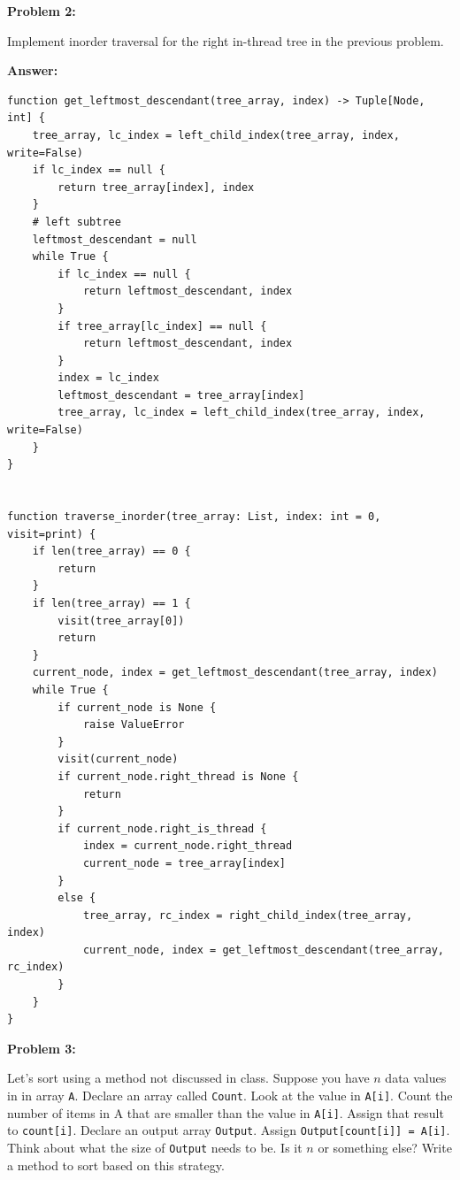 \documentclass[10pt,letterpaper,final]{report}
\begin{document}
\medskip
\noindent\textbf{Problem 2:}
\medskip

Implement inorder traversal for the right in-thread tree in the previous problem.

\medskip
\noindent\textbf{Answer:}
\medskip

\begin{verbatim}
function get_leftmost_descendant(tree_array, index) -> Tuple[Node, int] {
    tree_array, lc_index = left_child_index(tree_array, index, write=False)
    if lc_index == null {
        return tree_array[index], index
    }
    # left subtree
    leftmost_descendant = null
    while True {
        if lc_index == null {
            return leftmost_descendant, index
        }
        if tree_array[lc_index] == null {
            return leftmost_descendant, index
        }
        index = lc_index
        leftmost_descendant = tree_array[index]
        tree_array, lc_index = left_child_index(tree_array, index, write=False) 
    }
}


function traverse_inorder(tree_array: List, index: int = 0, visit=print) {
    if len(tree_array) == 0 {
        return
    }
    if len(tree_array) == 1 {
        visit(tree_array[0])
        return
    }
    current_node, index = get_leftmost_descendant(tree_array, index)
    while True {
        if current_node is None {
            raise ValueError
        }
        visit(current_node)
        if current_node.right_thread is None {
            return
        }
        if current_node.right_is_thread {
            index = current_node.right_thread
            current_node = tree_array[index]
        }
        else {
            tree_array, rc_index = right_child_index(tree_array, index)
            current_node, index = get_leftmost_descendant(tree_array, rc_index)
        }
    }
}
\end{verbatim}

\pagebreak
\noindent\textbf{Problem 3:}
\medskip

Let's sort using a method not discussed in class. Suppose you have $n$ data values in in array \texttt{A}.  Declare an array called \texttt{Count}.  Look at the value in \texttt{A[i]}. Count the number of items in A that are smaller than the value in \texttt{A[i]}.  Assign that result to \texttt{count[i]}. Declare an output array \texttt{Output}. Assign \texttt{Output[count[i]] = A[i]}. Think about what the size of \texttt{Output} needs to be. Is it $n$ or something else? Write a method to sort based on this strategy.
\end{document}
